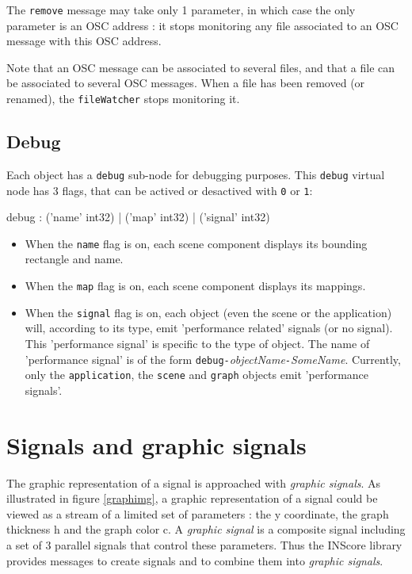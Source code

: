 \documentclass[a4paper,twoside]{report}
\newcommand{\toplevel}[1]	{\chapter{#1}}
\newcommand{\sublevel}[1]	{\section{#1}}
\newcommand{\OSC}[1]		{\texttt{#1}}
\begin{document}
The \OSC{remove} message may take only 1 parameter, in which case the only parameter is an OSC address : it stops monitoring any file associated to an OSC message with this OSC address.

Note that an OSC message can be associated to several files, and that a file can be associated to several OSC messages.
When a file has been removed (or renamed), the \OSC{fileWatcher} stops monitoring it.

\sublevel{Debug}

Each object has a \OSC{debug} sub-node for debugging purposes. This \OSC{debug} virtual node has 3 flags, that can be actived or desactived with \OSC{0} or \OSC{1}:

\begin{rail}
debug : 		('name'  int32)
		|	('map' int32)
		|	('signal' int32)
\end{rail}

\begin{itemize}
\item When the \OSC{name} flag is on, each scene component displays its bounding rectangle and name.
\item When the \OSC{map} flag is on, each scene component displays its mappings.
\item When the \OSC{signal} flag is on, each object (even the scene or the application) will, according to its type, emit 'performance related' signals (or no signal). This 'performance signal' is specific to the type of object. The name of 'performance signal' is of the form \OSC{debug-}\emph{objectName}\OSC{-}\emph{SomeName}. Currently, only the \OSC{application}, the \OSC{scene} and \OSC{graph} objects emit 'performance signals'.
\end{itemize}

\toplevel{Signals and graphic signals}
\label{graphsig}

The graphic representation of a signal is approached with \emph{graphic signals}. As illustrated in figure \ref{graphimg}, a graphic representation of a signal could be viewed as a stream of a limited set of parameters : the y coordinate, the graph thickness h and the graph color c. 
A \emph{graphic signal} is a composite signal including a set of 3 parallel signals that control these parameters. Thus the INScore library provides messages to create signals and to combine them into \emph{graphic signals}. 
\end{document}
